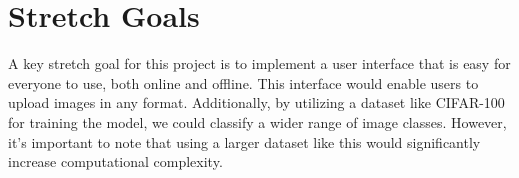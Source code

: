\documentclass{article}
\begin{document}
\section{Stretch Goals}

A key stretch goal for this project is to implement a user interface that is easy for everyone to use, 
both online and offline. This interface would enable users to upload images in any format. Additionally, 
by utilizing a dataset like CIFAR-100 for training the model, we could classify a wider range of image classes. 
However, it's important to note that using a larger dataset like this would significantly increase computational complexity.
\end{document}
